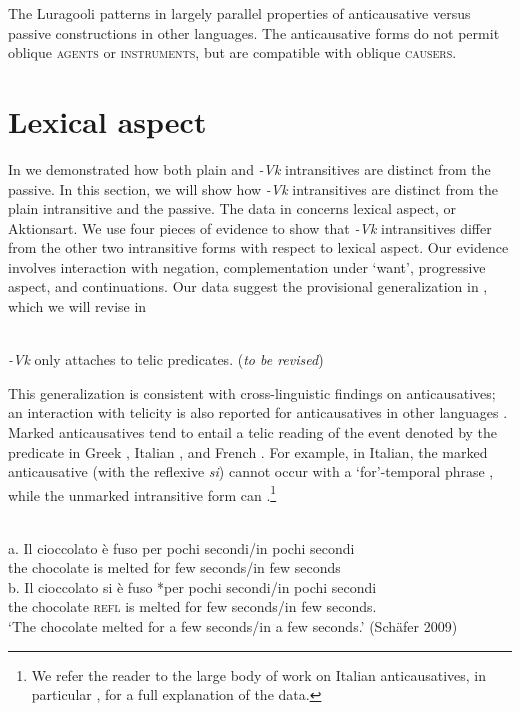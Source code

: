 \documentclass[output=paper]{langsci/langscibook}
\begin{document}
The Luragooli patterns in  largely parallel properties of anticausative versus passive constructions in other languages. The anticausative forms do not permit oblique \textsc{agents} or \textsc{instruments}, but are compatible with oblique \textsc{causers.}

\section{Lexical aspect}

In  we demonstrated how both plain and \textit{-Vk} intransitives are distinct from the passive. In this section, we will show how \textit{-Vk }intransitives are distinct from the plain intransitive and the passive. The data in  concerns lexical aspect, or Aktionsart. We use four pieces of evidence to show that \textit{-Vk} intransitives differ from the other two intransitive forms with respect to lexical aspect. Our evidence involves interaction with negation, complementation under ‘want’, progressive aspect, and continuations. Our data suggest the provisional generalization in , which we will revise in 

\ea\label{exx:}
{}\\
 \textit{-Vk }only attaches to telic predicates. (\textit{to be revised})
\z

This generalization is consistent with cross-linguistic findings on anticausatives; an interaction with telicity is also reported for anticausatives in other languages \citep{Labelle1992,Folli2002,FolliHarley2005}. Marked anticausatives tend to entail a telic reading of the event denoted by the predicate in Greek \citep{AlexiadouAnagnostopoulou2004}, Italian \citep{Folli2002}, and French \citep{ZribiHertz1987}. For example, in Italian, the marked anticausative (with the reflexive \textit{si}) cannot occur with a ‘for’-temporal phrase , while the unmarked intransitive form can .\footnote{ We refer the reader to the large body of work on Italian anticausatives, in particular \citet{Folli2002}, for a full explanation of the data.}

\ea\label{exx:}
\ea
{}\\
\ex
\gll a.  Il   cioccolato è  fuso     per pochi secondi/in pochi secondi\\
       the chocolate  is melted for few    seconds/in few    seconds\\
\ex       
\gll b.  Il    cioccolato si     è  fuso     *per pochi secondi/in pochi secondi\\
       the chocolate  \textsc{refl} is melted  for   few   seconds/in few seconds. \\
\glt ‘The chocolate melted for a few seconds/in a few seconds.’     (Schäfer 2009)
\z
\z
\end{document}
